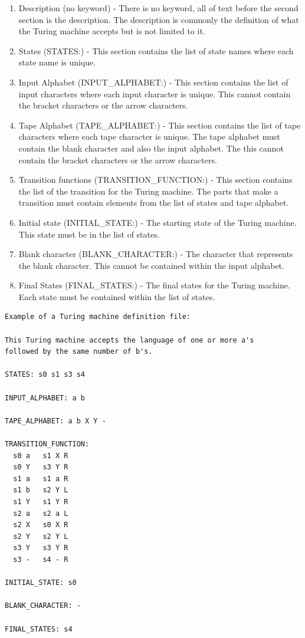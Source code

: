 \documentclass{report}
\begin{document}
\begin{enumerate}
\item Description (no keyword) - There is no keyword, all of text before the second section is the description. The description is commonly the definition of what the Turing machine accepts but is not limited to it.

\item States (STATES:) - This section contains the list of state names where each state name is unique.

\item Input Alphabet (INPUT\_ALPHABET:) - This section contains the list of input characters where each input character is unique. This cannot contain the bracket characters or the arrow characters.

\item Tape Alphabet (TAPE\_ALPHABET:) - This section contains the list of tape characters where each tape character is unique. The tape alphabet must contain the blank character and also the input alphabet. The this cannot contain the bracket characters or the arrow characters.

\item Transition functions (TRANSITION\_FUNCTION:) - This section contains the list of the transition for the Turing machine. The parts that make a transition must contain elements from the list of states and tape alphabet.

\item Initial state (INITIAL\_STATE:) - The starting state of the Turing machine. This state must be in the list of states.

\item Blank character (BLANK\_CHARACTER:) - The character that represents the blank character. This cannot be contained within the input alphabet.

\item Final States (FINAL\_STATES:) - The final states for the Turing machine. Each state must be contained within the list of states.

\end{enumerate}



\begin{verbatim}
Example of a Turing machine definition file:

This Turing machine accepts the language of one or more a's 
followed by the same number of b's.

STATES: s0 s1 s3 s4

INPUT_ALPHABET: a b

TAPE_ALPHABET: a b X Y -

TRANSITION_FUNCTION:
  s0 a   s1 X R
  s0 Y   s3 Y R
  s1 a   s1 a R
  s1 b   s2 Y L
  s1 Y   s1 Y R
  s2 a   s2 a L
  s2 X   s0 X R
  s2 Y   s2 Y L
  s3 Y   s3 Y R
  s3 -   s4 - R
  
INITIAL_STATE: s0

BLANK_CHARACTER: -

FINAL_STATES: s4
\end{verbatim}
\end{document}
